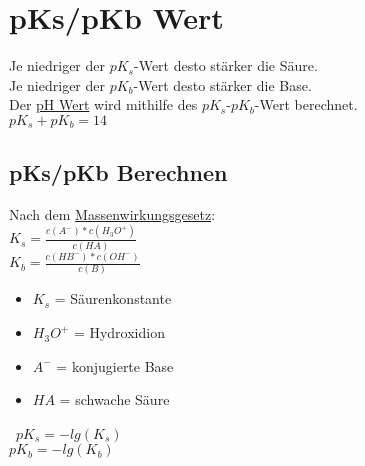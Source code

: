 \section{pKs/pKb Wert} \label{sec:pks_pkb}
Je niedriger der $pK_s$-Wert desto stärker die Säure. \\
Je niedriger der $pK_b$-Wert desto stärker die Base. \\
Der \hyperref[sec:ph_wert]{pH Wert} wird mithilfe des $pK_s$-$pK_b$-Wert berechnet. \\
$pK_s + pK_b = 14$ \\

\subsection{pKs/pKb Berechnen}
Nach dem \hyperref[sec:mwg]{Massenwirkungsgesetz}: \\
$K_s = \frac{c(A^-)*c(H_3O^+)}{c(HA)}$ \\
$K_b = \frac{c(HB^-)*c(OH^-)}{c(B)}$ \\

\begin{itemize}
    \item $K_s$ = Säurenkonstante
    \item $H_3O^+$ = Hydroxidion
    \item $A^-$ = konjugierte Base
    \item $HA$ = schwache Säure
\end{itemize}
\
$pK_s = -lg(K_s)$ \\
$pK_b = -lg(K_b)$

